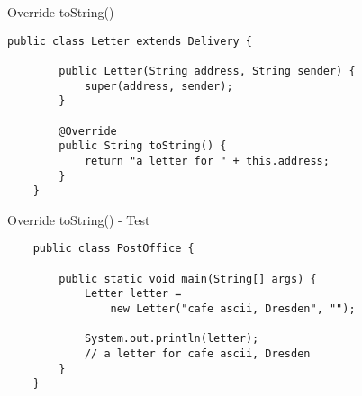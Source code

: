 \begin{frame}[fragile]{Override toString()}
	\begin{lstlisting}[escapechar=!]
	public class Letter extends Delivery {

	    public Letter(String address, String sender) {
	        super(address, sender);
	    }
	
	    @Override
	    public String toString() {
	        return "a letter for " + this.address;
	    }	
	}
	\end{lstlisting}
\end{frame}

\begin{frame}[fragile]{Override toString() - Test}
	\begin{lstlisting}
	public class PostOffice {
	    
	    public static void main(String[] args) {	    
	        Letter letter = 
	            new Letter("cafe ascii, Dresden", "");
	        
	        System.out.println(letter);
	        // a letter for cafe ascii, Dresden
	    }
	}
	\end{lstlisting}
\end{frame}


